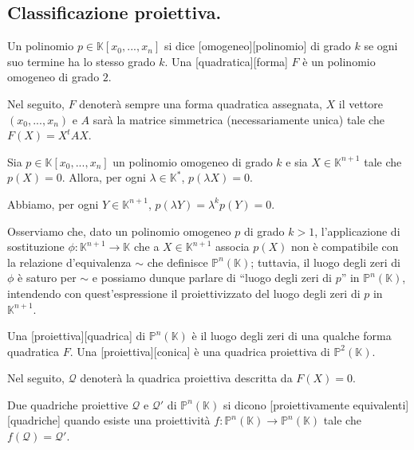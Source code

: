 \subsection{Classificazione proiettiva.}

\begin{Definition}\label{def46}
	Un polinomio $p \in \mathbb{K}[x_0, ..., x_n]$ si dice [omogeneo][polinomio] di grado $k$ se ogni suo termine ha lo stesso grado $k$. Una [quadratica][forma] $F$ \`e un polinomio omogeneo di grado $2$.
\end{Definition}
	\par Nel seguito, $F$ denoter\`a sempre una forma quadratica assegnata, $X$ il vettore $(x_0, ..., x_n)$ e $A$ sar\`a la matrice simmetrica (necessariamente unica) tale che $F(X) = X^tAX$.
\begin{Theorem}\label{th56}
	Sia $p \in \mathbb{K}[x_0, ..., x_n]$ un polinomio omogeneo di grado $k$ e sia $X \in \mathbb{K}^{n + 1}$ tale che $p(X) = 0$. Allora, per ogni $\lambda \in \mathbb{K}^*$, $p(\lambda X) = 0$.
\end{Theorem}
\Proof Abbiamo, per ogni $Y \in \mathbb{K}^{n + 1}$, $p(\lambda Y) = \lambda^k p(Y) = 0$. \EndProof
	\par Osserviamo che, dato un polinomio omogeneo $p$ di grado $k > 1$, l'applicazione di sostituzione $\phi: \mathbb{K}^{n + 1} \rightarrow \mathbb{K}$ che a $X \in \mathbb{K}^{n + 1}$ associa $p(X)$ non \`e compatibile con la relazione d'equivalenza $\sim$ che definisce $\mathbb{P}^n(\mathbb{K})$; tuttavia, il luogo degli zeri di $\phi$ \`e saturo per $\sim$ e possiamo dunque parlare di ``luogo degli zeri di $p$'' in $\mathbb{P}^n(\mathbb{K})$, intendendo con quest'espressione il proiettivizzato del luogo degli zeri di $p$ in $\mathbb{K}^{n + 1}$.
\begin{Definition}\label{def47}
	Una [proiettiva][quadrica] di $\mathbb{P}^n(\mathbb{K})$ \`e il luogo degli zeri di una qualche forma quadratica $F$. Una [proiettiva][conica] \`e una quadrica proiettiva di $\mathbb{P}^2(\mathbb{K})$.
\end{Definition}
	\par Nel seguito, $\mathcal{Q}$ denoter\`a la quadrica proiettiva descritta da $F(X) = 0$.
\begin{Definition}\label{def48}
	Due quadriche proiettive $\mathcal{Q}$ e $\mathcal{Q}'$ di $\mathbb{P}^n(\mathbb{K})$ si dicono [proiettivamente equivalenti][quadriche] quando esiste una proiettivit\`a $f: \mathbb{P}^n(\mathbb{K}) \rightarrow \mathbb{P}^n(\mathbb{K})$ tale che $f(\mathcal{Q}) = \mathcal{Q}'$.
\end{Definition}
